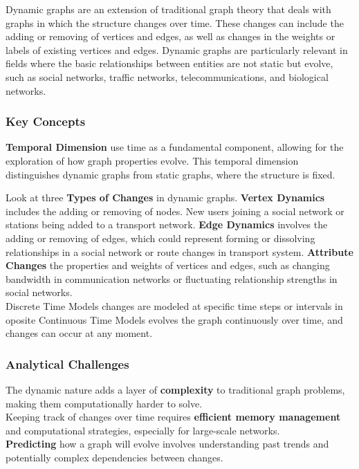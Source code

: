 \documentclass[12pt]{article}
\begin{document}
    Dynamic graphs are an extension of traditional graph theory that deals with
    graphs in which the structure changes over time. These changes can include the
    adding or removing of vertices and edges, as well as changes in the weights
    or labels of existing vertices and edges. Dynamic graphs are particularly
    relevant in fields where the basic relationships between entities are
    not static but evolve, such as social networks, traffic networks,
    telecommunications, and biological networks.

    \subsubsection{Key Concepts}

    \textbf{Temporal Dimension} use time as a fundamental component,
    allowing for the exploration of how graph properties evolve. This temporal
    dimension distinguishes dynamic graphs from static graphs, where the
    structure is fixed.
    
    Look at three \textbf{Types of Changes} in dynamic graphs. \textbf{Vertex Dynamics}
    includes the adding or removing of nodes. New users joining a
    social network or stations being added to a transport network.
    \textbf{Edge Dynamics} involves the adding or removing of edges, which could
    represent forming or dissolving relationships in a social network or route changes in
    transport system. \textbf{Attribute Changes} the properties and weights of vertices and edges,
    such as changing bandwidth in communication networks or fluctuating relationship strengths in social networks.\\
    Discrete Time Models changes are modeled at specific time steps or intervals in oposite
    Continuous Time Models evolves the graph continuously over time, and changes can
    occur at any moment.

    \subsubsection{Analytical Challenges}

    The dynamic nature adds a layer of \textbf{complexity} to traditional graph
    problems, making them computationally harder to solve.\\
    Keeping track of changes over time requires \textbf{efficient memory management}
    and computational strategies, especially for large-scale networks.\\
    \textbf{Predicting} how a graph will evolve involves understanding past trends
    and potentially complex dependencies between changes.
\end{document}
